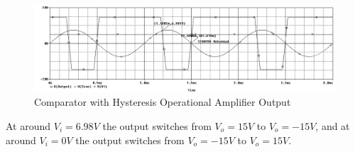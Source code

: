 \documentclass[12pt]{article}
\begin{document}
\begin{figure}[H]
    \centering
    \includegraphics[width=\textwidth]{assets/main/2023-08-20-15-32-24.png}
    \caption{Comparator with Hysteresis Operational Amplifier Output}
\end{figure}
At around $V_i = 6.98V$ the output switches from $V_o = 15V$ to $V_o = -15V$, and at around $V_i = 0V$ the output switches from $V_o = -15V$ to $V_o = 15V$.
\end{document}
